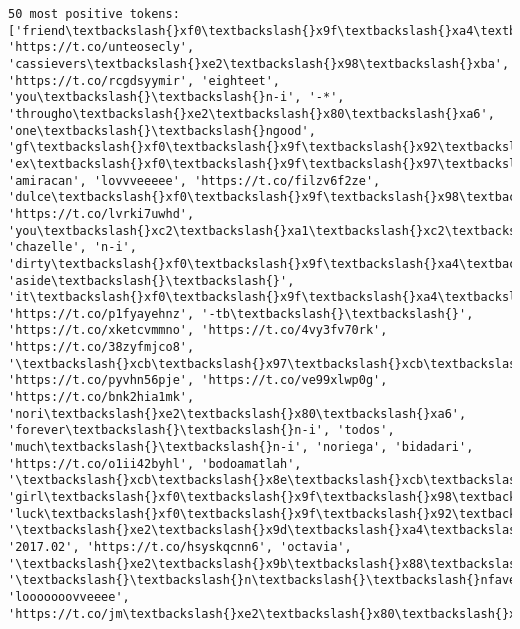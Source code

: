 \documentclass[11pt]{article}
\begin{document}
    \begin{Verbatim}[commandchars=\\\{\}]
50 most positive tokens:  
['friend\textbackslash{}xf0\textbackslash{}x9f\textbackslash{}xa4\textbackslash{}x9e\textbackslash{}xf0\textbackslash{}x9f\textbackslash{}x8f\textbackslash{}xbd', 'https://t.co/unteosecly', 'cassievers\textbackslash{}xe2\textbackslash{}x98\textbackslash{}xba', 'https://t.co/rcgdsyymir', 'eighteet', 'you\textbackslash{}\textbackslash{}n-i', '-*', 'througho\textbackslash{}xe2\textbackslash{}x80\textbackslash{}xa6', 'one\textbackslash{}\textbackslash{}ngood', 'gf\textbackslash{}xf0\textbackslash{}x9f\textbackslash{}x92\textbackslash{}x8d', 'ex\textbackslash{}xf0\textbackslash{}x9f\textbackslash{}x97\textbackslash{}x91', 'amiracan', 'lovvveeeee', 'https://t.co/filzv6f2ze', 'dulce\textbackslash{}xf0\textbackslash{}x9f\textbackslash{}x98\textbackslash{}xa9', 'https://t.co/lvrki7uwhd', 'you\textbackslash{}xc2\textbackslash{}xa1\textbackslash{}xc2\textbackslash{}xa1\textbackslash{}\textbackslash{}', 'chazelle', 'n-i', 'dirty\textbackslash{}xf0\textbackslash{}x9f\textbackslash{}xa4\textbackslash{}xa2', 'aside\textbackslash{}\textbackslash{}', 'it\textbackslash{}xf0\textbackslash{}x9f\textbackslash{}xa4\textbackslash{}x91', 'https://t.co/p1fyayehnz', '-tb\textbackslash{}\textbackslash{}', 'https://t.co/xketcvmmno', 'https://t.co/4vy3fv70rk', 'https://t.co/38zyfmjco8', '\textbackslash{}xcb\textbackslash{}x97\textbackslash{}xcb\textbackslash{}x8f\textbackslash{}xcb\textbackslash{}x8b', 'https://t.co/pyvhn56pje', 'https://t.co/ve99xlwp0g', 'https://t.co/bnk2hia1mk', 'nori\textbackslash{}xe2\textbackslash{}x80\textbackslash{}xa6', 'forever\textbackslash{}\textbackslash{}n-i', 'todos', 'much\textbackslash{}\textbackslash{}n-i', 'noriega', 'bidadari', 'https://t.co/o1ii42byhl', 'bodoamatlah', '\textbackslash{}xcb\textbackslash{}x8e\textbackslash{}xcb\textbackslash{}x8a\textbackslash{}xcb\textbackslash{}x97', 'girl\textbackslash{}xf0\textbackslash{}x9f\textbackslash{}x98\textbackslash{}xad\textbackslash{}xf0\textbackslash{}x9f\textbackslash{}x98\textbackslash{}xad\textbackslash{}xf0\textbackslash{}x9f\textbackslash{}x98\textbackslash{}xadits', 'luck\textbackslash{}xf0\textbackslash{}x9f\textbackslash{}x92\textbackslash{}x9e\textbackslash{}xf0\textbackslash{}x9f\textbackslash{}x92\textbackslash{}x9c', '\textbackslash{}xe2\textbackslash{}x9d\textbackslash{}xa4\textbackslash{}xf0\textbackslash{}x9f\textbackslash{}x92\textbackslash{}x99\textbackslash{}xf0\textbackslash{}x9f\textbackslash{}x92\textbackslash{}x9b\textbackslash{}xf0\textbackslash{}x9f\textbackslash{}x92\textbackslash{}x9c', '2017.02', 'https://t.co/hsyskqcnn6', 'octavia', '\textbackslash{}xe2\textbackslash{}x9b\textbackslash{}x88\textbackslash{}xe2\textbackslash{}x9a\textbackslash{}xa1\textbackslash{}xef\textbackslash{}xb8\textbackslash{}x8f\textbackslash{}xf0\textbackslash{}x9f\textbackslash{}x98\textbackslash{}x8d', '\textbackslash{}\textbackslash{}n\textbackslash{}\textbackslash{}nfaveeeee', 'looooooovveeee', 'https://t.co/jm\textbackslash{}xe2\textbackslash{}x80\textbackslash{}xa6'] 


\end{Verbatim}
\end{document}
